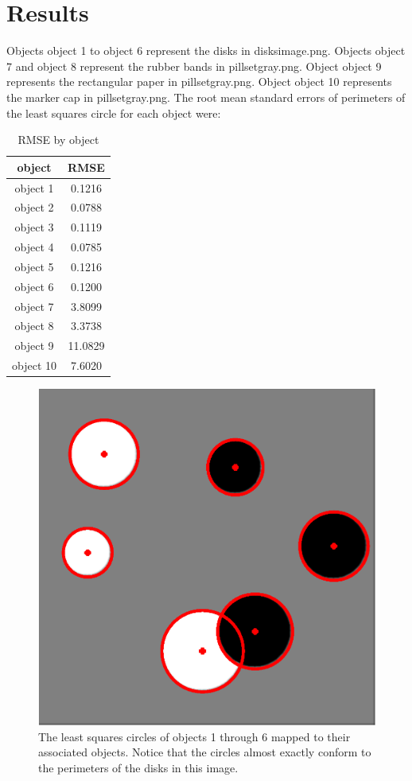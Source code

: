 \documentclass{article}
\begin{document}
	\section*{Results}
	Objects object 1 to object 6 represent the disks in {\selectfont disksimage.png}. Objects object 7 and object 8 represent the rubber bands in {\selectfont pillsetgray.png}. Object object 9 represents the rectangular paper in {\selectfont pillsetgray.png}. Object object 10 represents the marker cap in {\selectfont pillsetgray.png}. The root mean standard errors of perimeters of the least squares circle for each object were:
	\begin{table}[ht]
		\caption{RMSE by object}
		\centering
		\begin{tabular}{ c | c }
			\hline
			\hline	
			object & RMSE \\
			\hline
			object 1 & 0.1216\\
			object 2 & 0.0788\\
			object 3 & 0.1119\\
			object 4 & 0.0785\\
			object 5 & 0.1216\\
			object 6 & 0.1200\\
			object 7 & 3.8099\\
			object 8 & 3.3738\\
			object 9 & 11.0829\\
			object 10 & 7.6020\\
			\hline
		\end{tabular}
	\end{table}
	\begin{figure}[H]
		\centering
		\includegraphics{figure1}
		\caption{The least squares circles of objects 1 through 6 mapped to their associated objects. Notice that the circles almost exactly conform to the perimeters of the disks in this image.}
	\end{figure}
\end{document}
